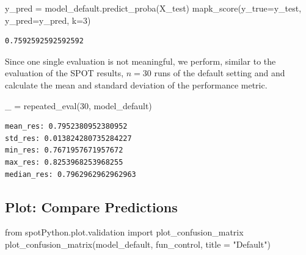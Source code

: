 \documentclass[
  letterpaper,
  DIV=11,
  numbers=noendperiod]{scrreprt}
\newenvironment{Shaded}{\begin{snugshade}}{\end{snugshade}}
\newcommand{\DecValTok}[1]{\textcolor[rgb]{0.68,0.00,0.00}{#1}}
\newcommand{\ImportTok}[1]{\textcolor[rgb]{0.00,0.46,0.62}{#1}}
\newcommand{\NormalTok}[1]{\textcolor[rgb]{0.00,0.23,0.31}{#1}}
\newcommand{\OperatorTok}[1]{\textcolor[rgb]{0.37,0.37,0.37}{#1}}
\newcommand{\StringTok}[1]{\textcolor[rgb]{0.13,0.47,0.30}{#1}}
\begin{document}
\begin{Shaded}
\begin{Highlighting}[]
\NormalTok{y\_pred }\OperatorTok{=}\NormalTok{ model\_default.predict\_proba(X\_test)}
\NormalTok{mapk\_score(y\_true}\OperatorTok{=}\NormalTok{y\_test, y\_pred}\OperatorTok{=}\NormalTok{y\_pred, k}\OperatorTok{=}\DecValTok{3}\NormalTok{)}
\end{Highlighting}
\end{Shaded}

\begin{verbatim}
0.7592592592592592
\end{verbatim}

Since one single evaluation is not meaningful, we perform, similar to
the evaluation of the SPOT results, \(n=30\) runs of the default setting
and and calculate the mean and standard deviation of the performance
metric.

\begin{Shaded}
\begin{Highlighting}[]
\NormalTok{\_ }\OperatorTok{=}\NormalTok{ repeated\_eval(}\DecValTok{30}\NormalTok{, model\_default)}
\end{Highlighting}
\end{Shaded}

\begin{verbatim}
mean_res: 0.7952380952380952
std_res: 0.013824280735284227
min_res: 0.7671957671957672
max_res: 0.8253968253968255
median_res: 0.7962962962962963
\end{verbatim}

\hypertarget{plot-compare-predictions-2}{%
\subsection{Plot: Compare
Predictions}\label{plot-compare-predictions-2}}

\begin{Shaded}
\begin{Highlighting}[]
\ImportTok{from}\NormalTok{ spotPython.plot.validation }\ImportTok{import}\NormalTok{ plot\_confusion\_matrix}
\NormalTok{plot\_confusion\_matrix(model\_default, fun\_control, title }\OperatorTok{=} \StringTok{"Default"}\NormalTok{)}
\end{Highlighting}
\end{Shaded}
\end{document}
